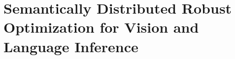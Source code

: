 \chapter{Semantically Distributed Robust Optimization for Vision and Language Inference} 
\label{chap:sdro}







 
